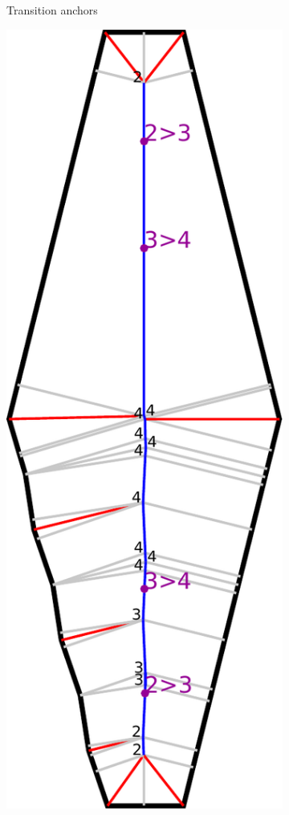 \begin{figure}
\begin{subfigure}{\figwidth}
\caption{Transition anchors}\label{beading_transitioning_filtering__transition_mids}
\end{subfigure}
\begin{subfigure}{\figwidth}
\includegraphics[width=\columnwidth]{sources/method/beading_transitioning_filtering__filtered.pdf}

\end{subfigure}
\end{figure}
